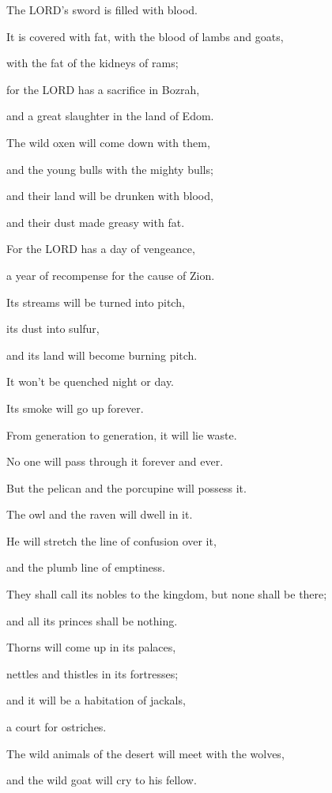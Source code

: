 \myverse{}The LORD’s sword is filled with blood.

It is covered with fat, with the blood of lambs and goats,

with the fat of the kidneys of rams;

for the LORD has a sacrifice in Bozrah,

and a great slaughter in the land of Edom.

\myverse{}The wild oxen will come down with them,

and the young bulls with the mighty bulls;

and their land will be drunken with blood,

and their dust made greasy with fat.


\vspace{\baselineskip} \myverse{}For the LORD has a day of vengeance,

a year of recompense for the cause of Zion.

\myverse{}Its streams will be turned into pitch,

its dust into sulfur,

and its land will become burning pitch.

\myverse{}It won’t be quenched night or day.

Its smoke will go up forever.

From generation to generation, it will lie waste.

No one will pass through it forever and ever.

\myverse{}But the pelican and the porcupine will possess it.

The owl and the raven will dwell in it.

He will stretch the line of confusion over it,

and the plumb line of emptiness.

\myverse{}They shall call its nobles to the kingdom, but none shall be
there;

and all its princes shall be nothing.

\myverse{}Thorns will come up in its palaces,

nettles and thistles in its fortresses;

and it will be a habitation of jackals,

a court for ostriches.

\myverse{}The wild animals of the desert will meet with the wolves,

and the wild goat will cry to his fellow.

